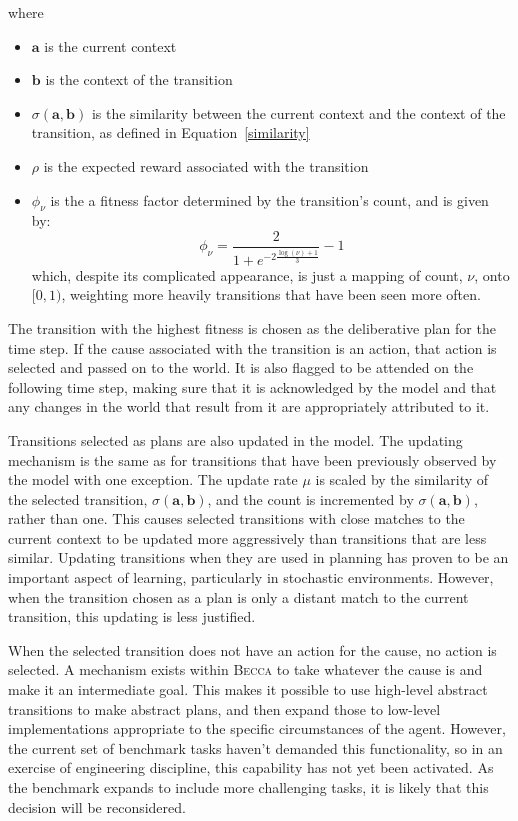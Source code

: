 where
\begin{itemize}
\item $\mathbf{a}$ is the current context
\item $\mathbf{b}$ is the context of the transition
\item $\sigma(\mathbf{a},\mathbf{b}) $ is the similarity between the current context and the context of the transition, as defined in Equation~\ref{similarity}
\item $\rho$ is the expected reward associated with the transition
\item $\phi_\nu$ is the a fitness factor determined by the transition's count, and is given by:
\begin{equation}
\phi_\nu = \frac{2}{1 + e^{-2 \frac{\log(\nu) + 1}{3}}} - 1
\end{equation}
which, despite its complicated appearance, is just a mapping of count, $\nu$, onto $[0,1)$, weighting more heavily transitions that have been seen more often.
\end{itemize}

The transition with the highest fitness is chosen as the deliberative plan for the time step. If the cause associated with the transition is an action, that action is selected and passed on to the world. It is also flagged to be attended on the following time step, making sure that it is acknowledged by the model and that any changes in the world that result from it are appropriately attributed to it.

Transitions selected as plans are also updated in the model. The updating mechanism is the same as for transitions that have been previously observed by the model with one exception. The update rate $\mu$ is scaled by the similarity of the selected transition, $\sigma(\mathbf{a},\mathbf{b})$, and the count is incremented by $\sigma(\mathbf{a},\mathbf{b})$, rather than one. This causes selected transitions with close matches to the current context to be updated more aggressively than transitions that are less similar. Updating transitions when they are used in planning has proven to be an important aspect of learning, particularly in stochastic environments. However, when the transition chosen as a plan is only a distant match to the current transition, this updating is less justified.

When the selected transition does not have an action for the cause, no action is selected. A mechanism exists within \textsc{Becca} to take whatever the cause is and make it an intermediate goal. This makes it possible to use high-level abstract transitions to make abstract plans, and then expand those to low-level implementations appropriate to the specific circumstances of the agent. However, the current set of benchmark tasks haven't demanded this functionality, so in an exercise of engineering discipline, this capability has not yet been activated. As the benchmark expands to include more challenging tasks, it is likely that this decision will be reconsidered.

